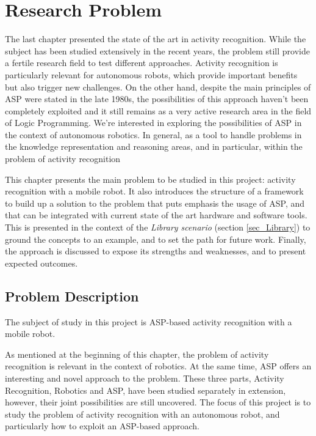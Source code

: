 \chapter{Research Problem}

The last chapter presented the state of the art in activity recognition.
While the subject has been studied extensively in the recent years, the problem still provide a fertile research field to test different approaches.
Activity recognition is particularly relevant for autonomous robots, which provide important benefits but also trigger new challenges.
On the other hand, despite the main principles of ASP were stated in the late 1980s, the possibilities of this approach haven't been completely exploited and it still remains as a very active research area in the field of Logic Programming.
We're interested in exploring the possibilities of ASP in the context of autonomous robotics.
In general, as a tool to handle problems in the knowledge representation and reasoning areas, and in particular, within the problem of activity recognition

This chapter presents the main problem to be studied in this project: activity recognition with a mobile robot.
It also introduces the structure of a framework to build up a solution to the problem that puts emphasis the usage of ASP, and that can be integrated with current state of the art hardware and software tools. 
This is presented in the context of the \textit{Library scenario} (section \ref{sec_Library}) to ground the concepts to an example, and to set the path for future work.
Finally, the approach is discussed to expose its strengths and weaknesses, and to present expected outcomes.

\section{Problem Description} \label{sec_problem}

The subject of study in this project is ASP-based activity recognition with a mobile robot.

As mentioned at the beginning of this chapter, the problem of activity recognition is relevant in the context of robotics.
At the same time, ASP offers an interesting and novel approach to the problem.
These three parts, Activity Recognition, Robotics and ASP, have been studied separately in extension, however, their joint possibilities are still uncovered.
The focus of this project is to study the problem of activity recognition with an autonomous robot, and particularly how to exploit an ASP-based approach.

